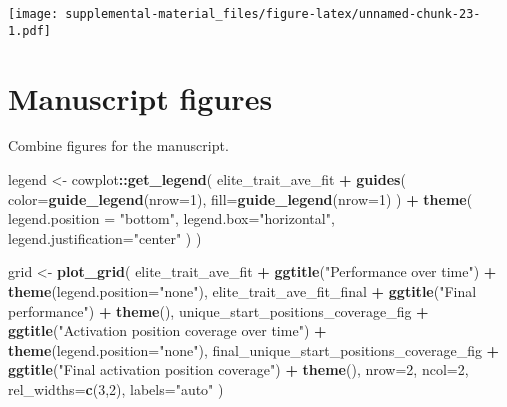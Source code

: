 \documentclass[]{book}
\newenvironment{Shaded}{\begin{snugshade}}{\end{snugshade}}
\newcommand{\DataTypeTok}[1]{\textcolor[rgb]{0.13,0.29,0.53}{#1}}
\newcommand{\DecValTok}[1]{\textcolor[rgb]{0.00,0.00,0.81}{#1}}
\newcommand{\KeywordTok}[1]{\textcolor[rgb]{0.13,0.29,0.53}{\textbf{#1}}}
\newcommand{\NormalTok}[1]{#1}
\newcommand{\OperatorTok}[1]{\textcolor[rgb]{0.81,0.36,0.00}{\textbf{#1}}}
\newcommand{\StringTok}[1]{\textcolor[rgb]{0.31,0.60,0.02}{#1}}
\begin{document}
\texttt{[image: supplemental-material\_files/figure-latex/unnamed-chunk-23-1.pdf]}

\hypertarget{manuscript-figures-1}{%
\section{Manuscript figures}\label{manuscript-figures-1}}

Combine figures for the manuscript.

\begin{Shaded}
\begin{Highlighting}[]
\NormalTok{legend <-}\StringTok{ }\NormalTok{cowplot}\OperatorTok{::}\KeywordTok{get_legend}\NormalTok{(}
\NormalTok{    elite_trait_ave_fit }\OperatorTok{+}
\StringTok{      }\KeywordTok{guides}\NormalTok{(}
        \DataTypeTok{color=}\KeywordTok{guide_legend}\NormalTok{(}\DataTypeTok{nrow=}\DecValTok{1}\NormalTok{),}
        \DataTypeTok{fill=}\KeywordTok{guide_legend}\NormalTok{(}\DataTypeTok{nrow=}\DecValTok{1}\NormalTok{)}
\NormalTok{      ) }\OperatorTok{+}
\StringTok{      }\KeywordTok{theme}\NormalTok{(}
        \DataTypeTok{legend.position =} \StringTok{"bottom"}\NormalTok{,}
        \DataTypeTok{legend.box=}\StringTok{"horizontal"}\NormalTok{,}
        \DataTypeTok{legend.justification=}\StringTok{"center"}
\NormalTok{      )}
\NormalTok{  )}

\NormalTok{grid <-}\StringTok{ }\KeywordTok{plot_grid}\NormalTok{(}
\NormalTok{  elite_trait_ave_fit }\OperatorTok{+}
\StringTok{    }\KeywordTok{ggtitle}\NormalTok{(}\StringTok{"Performance over time"}\NormalTok{) }\OperatorTok{+}
\StringTok{    }\KeywordTok{theme}\NormalTok{(}\DataTypeTok{legend.position=}\StringTok{"none"}\NormalTok{),}
\NormalTok{  elite_trait_ave_fit_final }\OperatorTok{+}
\StringTok{    }\KeywordTok{ggtitle}\NormalTok{(}\StringTok{"Final performance"}\NormalTok{) }\OperatorTok{+}
\StringTok{    }\KeywordTok{theme}\NormalTok{(),}
\NormalTok{  unique_start_positions_coverage_fig }\OperatorTok{+}
\StringTok{    }\KeywordTok{ggtitle}\NormalTok{(}\StringTok{"Activation position coverage over time"}\NormalTok{) }\OperatorTok{+}
\StringTok{    }\KeywordTok{theme}\NormalTok{(}\DataTypeTok{legend.position=}\StringTok{"none"}\NormalTok{),}
\NormalTok{  final_unique_start_positions_coverage_fig }\OperatorTok{+}
\StringTok{    }\KeywordTok{ggtitle}\NormalTok{(}\StringTok{"Final activation position coverage"}\NormalTok{) }\OperatorTok{+}
\StringTok{    }\KeywordTok{theme}\NormalTok{(),}
  \DataTypeTok{nrow=}\DecValTok{2}\NormalTok{,}
  \DataTypeTok{ncol=}\DecValTok{2}\NormalTok{,}
  \DataTypeTok{rel_widths=}\KeywordTok{c}\NormalTok{(}\DecValTok{3}\NormalTok{,}\DecValTok{2}\NormalTok{),}
  \DataTypeTok{labels=}\StringTok{"auto"}
\NormalTok{)}


\end{Highlighting}
\end{Shaded}
\end{document}
